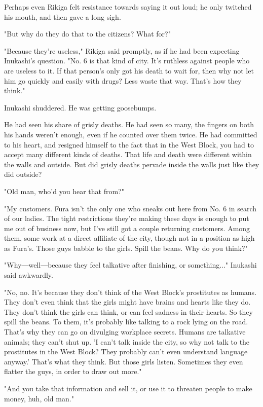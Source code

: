 Perhaps even Rikiga felt resistance towards saying it out loud; he only
twitched his mouth, and then gave a long sigh.

"But why do they do that to the citizens? What for?"

"Because they're useless," Rikiga said promptly, as if he had been
expecting Inukashi's question. "No. 6 is that kind of city. It's
ruthless against people who are useless to it. If that person's only got
his death to wait for, then why not let him go quickly and easily with
drugs? Less waste that way. That's how they think."

Inukashi shuddered. He was getting goosebumps.

He had seen his share of grisly deaths. He had seen so many, the fingers
on both his hands weren't enough, even if he counted over them twice. He
had committed to his heart, and resigned himself to the fact that in the
West Block, you had to accept many different kinds of deaths. That life
and death were different within the walls and outside. But did grisly
deaths pervade inside the walls just like they did outside?

"Old man, who'd you hear that from?"

"My customers. Fura isn't the only one who sneaks out here from No. 6 in
search of our ladies. The tight restrictions they're making these days
is enough to put me out of business now, but I've still got a couple
returning customers. Among them, some work at a direct affiliate of the
city, though not in a position as high as Fura's. Those guys babble to
the girls. Spill the beans. Why do you think?"

"Why―well―because they feel talkative after finishing, or something..."
Inukashi said awkwardly.

"No, no. It's because they don't think of the West Block's prostitutes
as humans. They don't even think that the girls might have brains and
hearts like they do. They don't think the girls can think, or can feel
sadness in their hearts. So they spill the beans. To them, it's probably
like talking to a rock lying on the road. That's why they can go on
divulging workplace secrets. Humans are talkative animals; they can't
shut up. 'I can't talk inside the city, so why not talk to the
prostitutes in the West Block? They probably can't even understand
language anyway.' That's what they think. But those girls listen.
Sometimes they even flatter the guys, in order to draw out more."

"And you take that information and sell it, or use it to threaten people
to make money, huh, old man."

